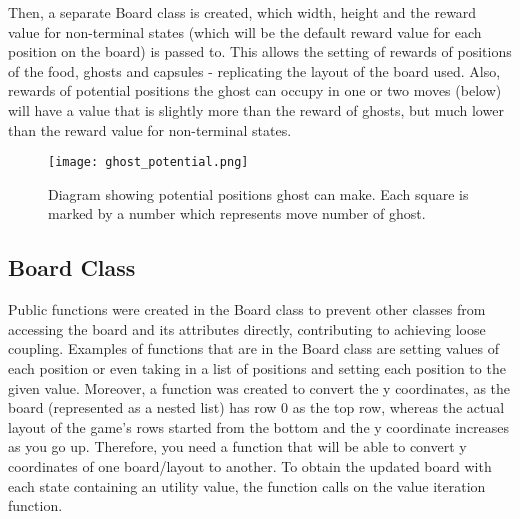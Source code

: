 \documentclass[12pt]{report}
\begin{document}
      \newline \newline
      Then, a separate Board class is created, which width, height and the reward value for non-terminal states (which will be the default reward value for each position on the board) is passed to. This allows the setting of rewards of positions of the food, ghosts and capsules - replicating the layout of the board used. Also, rewards of potential positions the ghost can occupy in one or two moves (below) will have a value that is slightly more than the reward of ghosts, but much lower than the reward value for non-terminal states.
        \begin{figure}[H]
          \centering
          \texttt{[image: ghost\_potential.png]}
          \caption{Diagram showing potential positions ghost can make. Each square is marked by a number which represents move number of ghost.}
        \end{figure}
      \vspace{-5mm}
      \subsection*{Board Class}
        Public functions were created in the Board class to prevent other classes from accessing the board and its attributes directly, contributing to achieving loose coupling. Examples of functions that are in the Board class are setting values of each position or even taking in a list of positions and setting each position to the given value. Moreover, a function was created to convert the y coordinates, as the board (represented as a nested list) has row 0 as the top row, whereas the actual layout of the game's rows started from the bottom and the y coordinate increases as you go up. Therefore, you need a function that will be able to convert y coordinates of one board/layout to another.
        \newline \newline
        To obtain the updated board with each state containing an utility value, the function calls on the value iteration function.
\end{document}
